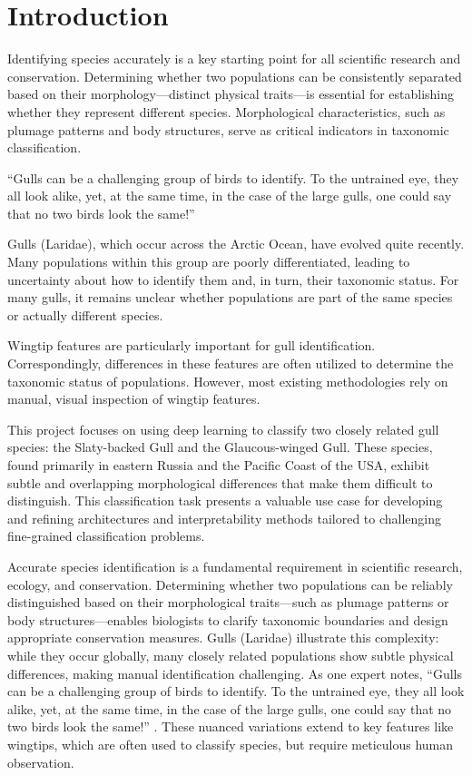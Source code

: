 
\chapter{Introduction}

Identifying species accurately is a key starting point for all scientific research and conservation. Determining whether two populations can be consistently separated based on their morphology—distinct physical traits—is essential for establishing whether they represent different species. Morphological characteristics, such as plumage patterns and body structures, serve as critical indicators in taxonomic classification.

``Gulls can be a challenging group of birds to identify. To the untrained eye, they all look alike, yet, at the same time, in the case of the large gulls, one could say that no two birds look the same!'' \cite{gull_identification}

Gulls (Laridae), which occur across the Arctic Ocean, have evolved quite recently. Many populations within this group are poorly differentiated, leading to uncertainty about how to identify them and, in turn, their taxonomic status. For many gulls, it remains unclear whether populations are part of the same species or actually different species.

Wingtip features are particularly important for gull identification. Correspondingly, differences in these features are often utilized to determine the taxonomic status of populations. However, most existing methodologies rely on manual, visual inspection of wingtip features.

This project focuses on using deep learning to classify two closely related gull species: the Slaty-backed Gull and the Glaucous-winged Gull. These species, found primarily in eastern Russia and the Pacific Coast of the USA, exhibit subtle and overlapping morphological differences that make them difficult to distinguish. This classification task presents a valuable use case for developing and refining architectures and interpretability methods tailored to challenging fine-grained classification problems.

Accurate species identification is a fundamental requirement in scientific research, ecology, and conservation. Determining whether two populations can be reliably distinguished based on their morphological traits—such as plumage patterns or body structures—enables biologists to clarify taxonomic boundaries and design appropriate conservation measures. Gulls (Laridae) illustrate this complexity: while they occur globally, many closely related populations show subtle physical differences, making manual identification challenging. As one expert notes, ``Gulls can be a challenging group of birds to identify. To the untrained eye, they all look alike, yet, at the same time, in the case of the large gulls, one could say that no two birds look the same!'' \cite{gull_identification}. These nuanced variations extend to key features like wingtips, which are often used to classify species, but require meticulous human observation.

